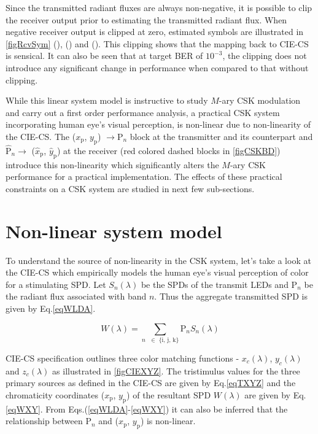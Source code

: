 Since the transmitted radiant fluxes are always non-negative, it is possible to clip the receiver output prior to estimating the transmitted
radiant flux.  When negative receiver output is clipped at zero, estimated
symbols are illustrated in
\figurename{ }\ref{figRcvSym} (),
() and (). This
clipping shows that the mapping back to CIE-CS is sensical. It can also be seen that at target BER of $10^{-3}$, the clipping does not
introduce any significant change in performance when compared to that without clipping.

While this linear system model is instructive to study $M$-ary CSK modulation
and carry out a first order performance analysis, a practical CSK
system incorporating human eye's visual perception, is non-linear due to non-linearity of the CIE-CS. The ($x_{\text{p}}$, $y_{\text{p}}$) $\rightarrow  \text{P}_{n}$ block at the transmitter and its counterpart and $\hat{\text{P}}_{n}\rightarrow$ ($\hat{x}_{\text{p}}$, $\hat{y}_{\text{p}}$) at the receiver (red colored dashed
blocks in \figurename{ }\ref{figCSKBD}) introduce this non-linearity
which significantly alters the $M$-ary CSK performance for a practical
implementation. The effects of these practical constraints on a CSK
system are studied in next few sub-sections.
\section{Non-linear system model}
\label{sec:cskNonlinear}
To understand the source of non-linearity in the CSK system, let's take a look at the CIE-CS which empirically models the human eye's visual perception of color for a stimulating SPD. Let $S_{n}(\lambda)$ be the SPDs of the transmit LEDs and P$_{n}$ be the radiant flux associated with band $n$. Thus the aggregate transmitted SPD is given by Eq.\eqref{eqWLDA}.

\begin{equation}
	W(\lambda) = \sum\limits_{n\text{ }\in\text{ \{i, j, k\}}}\text{P}_{n}S_{n}(\lambda)
	\label{eqWLDA}
\end{equation}

CIE-CS specification outlines three color matching functions - $x_{c}(\lambda)$, $y_{c}(\lambda)$ and $z_{c}(\lambda)$ as illustrated in \figurename{ }\ref{figCIEXYZ}. The tristimulus values for the three primary sources as defined in the CIE-CS are given by Eq.\eqref{eqTXYZ} and the chromaticity coordinates ($x_{\text{p}}$, $y_{\text{p}}$) of the resultant SPD $W(\lambda)$ are given by Eq.\eqref{eqWXY}. From Eqs.(\ref{eqWLDA}-\ref{eqWXY}) it can also be inferred that the relationship between P$_{n}$ and ($x_{\text{p}}$, $y_{\text{p}}$) is non-linear.

